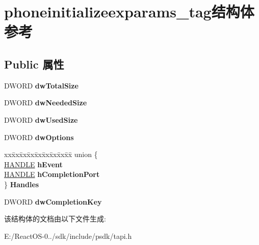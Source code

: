 \hypertarget{structphoneinitializeexparams__tag}{}\section{phoneinitializeexparams\+\_\+tag结构体 参考}
\label{structphoneinitializeexparams__tag}
\subsection*{Public 属性}
\begin{DoxyCompactItemize}
\item 
\mbox{\label{structphoneinitializeexparams__tag_a018cdcafdf7aa92e2b3dabf7adb0da74}} 
D\+W\+O\+RD {\bfseries dw\+Total\+Size}
\item 
\mbox{\label{structphoneinitializeexparams__tag_a5fde67acc5c9b53e2553ee517761155b}} 
D\+W\+O\+RD {\bfseries dw\+Needed\+Size}
\item 
\mbox{\label{structphoneinitializeexparams__tag_a28b0bad86d24540c2676f114e64861ca}} 
D\+W\+O\+RD {\bfseries dw\+Used\+Size}
\item 
\mbox{\label{structphoneinitializeexparams__tag_a3038485a27118583d761e300d01f6fc5}} 
D\+W\+O\+RD {\bfseries dw\+Options}
\item 
\mbox{\label{structphoneinitializeexparams__tag_ac3215e395862d4b1af88e24976729c2a}} 
\begin{tabbing}
xx\=xx\=xx\=xx\=xx\=xx\=xx\=xx\=xx\=\kill
union \{\\
\>\hyperlink{interfacevoid}{HANDLE} {\bfseries hEvent}\\
\>\hyperlink{interfacevoid}{HANDLE} {\bfseries hCompletionPort}\\
\} {\bfseries Handles}\\

\end{tabbing}\item 
\mbox{\label{structphoneinitializeexparams__tag_a61d5e613bc24f27fa0c7a215798cbb42}} 
D\+W\+O\+RD {\bfseries dw\+Completion\+Key}
\end{DoxyCompactItemize}


该结构体的文档由以下文件生成\+:\begin{DoxyCompactItemize}
\item 
E\+:/\+React\+O\+S-\/0../sdk/include/psdk/tapi.\+h\end{DoxyCompactItemize}

